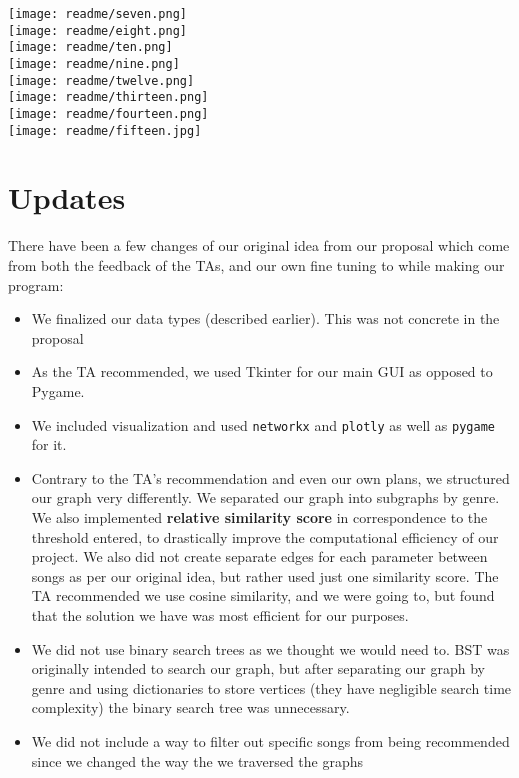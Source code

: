 \documentclass[fontsize=11pt]{article}
\begin{document}
    \texttt{[image: readme/seven.png]}\\
    \texttt{[image: readme/eight.png]}\\
    \newpage
    \texttt{[image: readme/ten.png]}\\

    \texttt{[image: readme/nine.png]}\\
    \texttt{[image: readme/twelve.png]}\\

    \newpage
    \texttt{[image: readme/thirteen.png]}\\

    \texttt{[image: readme/fourteen.png]}\\
    \texttt{[image: readme/fifteen.jpg]}\\

    \newpage

    \section*{Updates}

    There have been a few changes of our original idea from our proposal which come from both the feedback of the TAs, and our own fine tuning to while making our program:\\

    \begin{itemize}
        \item We finalized our data types (described earlier). This was not concrete in the proposal
        \item As the TA recommended, we used Tkinter for our main GUI as opposed to Pygame.
        \item We included visualization and used \texttt{networkx} and \texttt{plotly} as well as \texttt{pygame} for it.
        \item Contrary to the TA's recommendation and even our own plans, we structured our graph very differently. We separated our graph into subgraphs by genre. We also implemented \textbf{relative similarity score} in correspondence to the threshold entered, to drastically improve the computational efficiency of our project. We also did not create separate edges for each parameter between songs as per our original idea, but rather used just one similarity score. The TA recommended we use cosine similarity, and we were going to, but found that the solution we have was most efficient for our purposes.
        \item We did not use binary search trees as we thought we would need to. BST was originally intended to search our graph, but after separating our graph by genre and using dictionaries to store vertices (they have negligible search time complexity) the binary search tree was unnecessary.
        \item We did not include a way to filter out specific songs from being recommended since we changed the way the we traversed the graphs
    \end{itemize}
\end{document}
